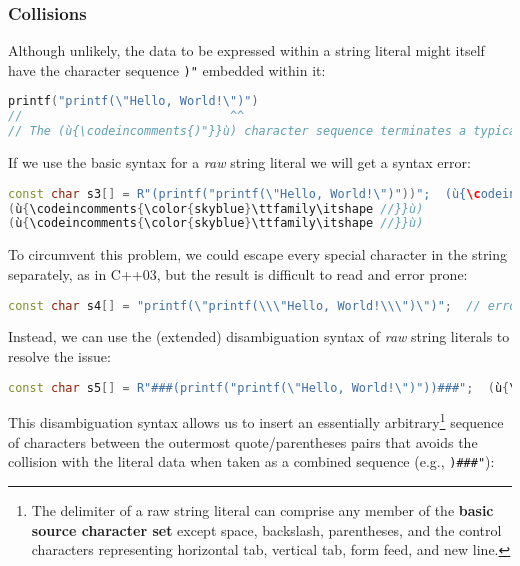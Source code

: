 \subsubsection[Collisions]{Collisions}\label{collisions}

Although unlikely, the data to be expressed within a
string literal might itself have the character sequence \texttt{)"}
embedded within it:

\begin{lstlisting}[language=C++]
printf("printf(\"Hello, World!\")")
//                             ^^
// The (ù{\codeincomments{)"}}ù) character sequence terminates a typical raw string literal.
\end{lstlisting}

\noindent If we use the basic syntax for a \emph{raw} string literal we will get a
syntax error:

\begin{lstlisting}[language=C++,]
const char s3[] = R"(printf("printf(\"Hello, World!\")"))";  (ù{\codeincomments{\color{skyblue}\ttfamily\itshape // collision}}ù)
(ù{\codeincomments{\color{skyblue}\ttfamily\itshape //}}ù)                                                    (ù{\codeincomments{\color{skyblue}\ttfamily\itshape\textasciicircum\textasciicircum}}ù)
(ù{\codeincomments{\color{skyblue}\ttfamily\itshape //}}ù)                       (ù{\codeincomments{\color{skyblue}\ttfamily\itshape Syntax error after literal ends}}ù)
\end{lstlisting}

\noindent To circumvent this problem, we could escape every special character in
the string separately, as in C++03, but the result is difficult to read
and error prone:

\begin{lstlisting}[language=C++]
const char s4[] = "printf(\"printf(\\\"Hello, World!\\\")\")";  // error prone
\end{lstlisting}

\noindent Instead, we can use the (extended) disambiguation syntax of \emph{raw}
string literals to resolve the issue:

\begin{lstlisting}[language=C++]
const char s5[] = R"###(printf("printf(\"Hello, World!\")"))###";  (ù{\codeincomments{\color{skyblue}\ttfamily\itshape // cleaner}}ù)
\end{lstlisting}

\noindent This disambiguation syntax allows us to insert an essentially
arbitrary{\cprotect\footnote{The delimiter of a raw string literal can
comprise any member of the \textbf{basic source character set} except
space, backslash, parentheses, and the control characters representing
horizontal tab, vertical tab, form feed, and new line.}} sequence of
characters between the outermost quote/parentheses pairs that avoids the
collision with the literal data when taken as a combined sequence (e.g.,
\texttt{)\#\#\#"}):

